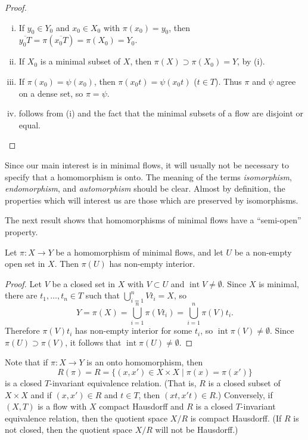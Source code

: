 \begin{proof}~
    \begin{enumerate}[(i)]
        \item If $y_0 \in Y_0$ and $x_0 \in X_0$ with $\pi(x_0) = y_0$, then $\overline{y_0 T} = \pi(\overline{x_0 T}) = \pi(X_0) = Y_0$.
        \item If $X_0$ is a minimal subset of $X$, then $\pi(X) \supset \pi(X_0) = Y$, by (i).
        \item If $\pi(x_0) = \psi(x_0)$, then $\pi(x_0 t) = \psi(x_0 t)$ ($t \in T$). Thus $\pi$ and $\psi$ agree on a dense set, so $\pi = \psi$.
        \item follows from (i) and the fact that the minimal subsets of a flow are disjoint or equal.
    \end{enumerate}
\end{proof}


Since our main interest is in minimal flows, it will usually not be necessary to specify that a homomorphism is onto. The meaning of the terms \textit{isomorphism}, \textit{endomorphism}, and \textit{automorphism} should be clear. Almost by definition, the properties which will interest us are those which are preserved by isomorphisms.

The next result shows that homomorphisms of minimal flows have a “semi-open” property.

\begin{theorem*}[15]
    Let $\pi : X \to Y$ be a homomorphism of minimal flows, and let $U$ be a non-empty open set in $X$. Then $\pi(U)$ has non-empty interior.
\end{theorem*}

\begin{proof}
    Let $V$ be a closed set in $X$ with $V \subset U$ and $\operatorname{int} V \ne \emptyset$. Since $X$ is minimal, there are $t_1, \ldots, t_n \in T$ such that $\bigcup_{i=1}^n V t_i = X$, so
    \[
        Y = \pi(X) = \bigcup_{i=1}^n \pi(V t_i) = \bigcup_{i=1}^n \pi(V)t_i.
    \]
    Therefore $\pi(V)t_i$ has non-empty interior for some $t_i$, so $\operatorname{int} \pi(V) \ne \emptyset$. Since $\pi(U) \supset \pi(V)$, it follows that $\operatorname{int} \pi(U) \ne \emptyset$.
\end{proof}


Note that if $\pi : X \to Y$ is an onto homomorphism, then
\[
    R(\pi) = R = \{(x, x') \in X \times X \mid \pi(x) = \pi(x')\}
\]
is a closed $T$-invariant equivalence relation. (That is, $R$ is a closed subset of $X \times X$ and if $(x, x') \in R$ and $t \in T$, then $(xt, x't) \in R$.) Conversely, if $(X, T)$ is a flow with $X$ compact Hausdorff and $R$ is a closed $T$-invariant equivalence relation, then the quotient space $X/R$ is compact Hausdorff. (If $R$ is not closed, then the quotient space $X/R$ will not be Hausdorff.)

